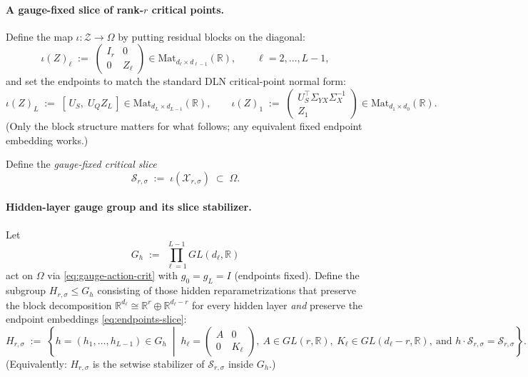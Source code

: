 \documentclass{article}
\newcommand{\R}{\mathbb{R}}
\newcommand{\Mat}{\mathrm{Mat}}
\theoremstyle{definition}
\begin{document}
\paragraph{A gauge-fixed slice of rank-$r$ critical points.}
Define the map $\iota:\mathcal Z\to \Omega$ by putting residual blocks on the diagonal:
\begin{equation}\label{eq:iota-Z}
\iota(Z)_\ell \;:=\;
\begin{pmatrix}
I_r & 0\\
0 & Z_\ell
\end{pmatrix}
\in \Mat_{d_\ell\times d_{\ell-1}}(\R),
\qquad \ell=2,\dots,L-1,
\end{equation}
and set the endpoints to match the standard DLN critical-point normal form:
\begin{equation}\label{eq:endpoints-slice}
\iota(Z)_L \;:=\; [\,U_S,\; U_Q Z_L\,]\in \Mat_{d_L\times d_{L-1}}(\R),
\qquad
\iota(Z)_1 \;:=\;
\begin{pmatrix}
U_S^\top \Sigma_{YX}\Sigma_X^{-1}\\
Z_1
\end{pmatrix}
\in \Mat_{d_1\times d_0}(\R).
\end{equation}
(Only the block structure matters for what follows; any equivalent fixed endpoint embedding works.)

Define the \emph{gauge-fixed critical slice}
\begin{equation}\label{eq:Scrit-def}
\mathcal S_{r,\sigma} \;:=\; \iota(\mathcal X_{r,\sigma}) \;\subset\; \Omega .
\end{equation}

\paragraph{Hidden-layer gauge group and its slice stabilizer.}
Let
\[
G_h \;:=\; \prod_{\ell=1}^{L-1} GL(d_\ell,\R)
\]
act on $\Omega$ via \eqref{eq:gauge-action-crit} with $g_0=g_L=I$ (endpoints fixed).
Define the subgroup $H_{r,\sigma}\le G_h$ consisting of those hidden reparametrizations that preserve the block decomposition
$\R^{d_\ell}\cong \R^r\oplus \R^{d_\ell-r}$ for every hidden layer \emph{and} preserve the endpoint embeddings
\eqref{eq:endpoints-slice}:
\begin{equation}\label{eq:Hrsigma-def}
H_{r,\sigma}
\;:=\;
\left\{
h=(h_1,\dots,h_{L-1})\in G_h \;\middle|\;
h_\ell=
\begin{pmatrix}
A & 0\\
0 & K_\ell
\end{pmatrix},
\ A\in GL(r,\R),\ K_\ell\in GL(d_\ell-r,\R),
\ \text{and } h\cdot \mathcal S_{r,\sigma}=\mathcal S_{r,\sigma}
\right\}.
\end{equation}
(Equivalently: $H_{r,\sigma}$ is the setwise stabilizer of $\mathcal S_{r,\sigma}$ inside $G_h$.)
\end{document}
